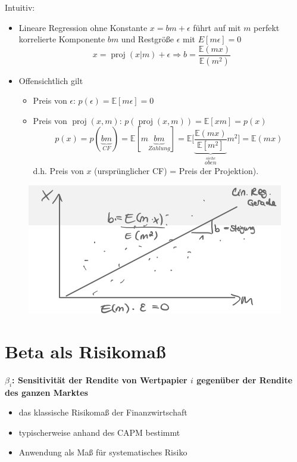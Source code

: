 \documentclass[12pt]{extreport} %
\theoremstyle{named}
\theoremstyle{nnamed}
\theoremstyle{itshape}
\theoremstyle{normal}
\begin{document}
Intuitiv:
\begin{itemize}
	\item Lineare Regression ohne Konstante $x = bm + \epsilon$ führt auf mit $m$ perfekt korrelierte Komponente $bm$ und Restgröße $\epsilon$ mit $E[m\epsilon] = 0$
	$$ x = \operatorname{proj}(x|m) + \epsilon \Rightarrow b = \frac{\mathbb{E}(mx)}{\mathbb{E}(m^2)} $$
	\item Offensichtlich gilt
		\begin{itemize}
			\item Preis von $\epsilon$: $p(\epsilon) = \mathbb{E}[m\epsilon] = 0$
			\item Preis von $\operatorname{proj}(x, m)$: $ p \left(\operatorname{proj}(x, m) \right) = \mathbb{E}[xm] = p(x)$
				$$ p(x) = p(\underbrace{b m}_{CF}) = \mathbb{E}[m\underbrace{bm}_{Zahlung}] = \mathbb{E} \Bigg[ \underbrace{\frac{\mathbb{E}(mx)}{\mathbb{E}[m^2]}}_{\overset{siehe}{oben}} m^2 \Bigg] = \mathbb{E}(mx)$$
				d.h. Preis von $x$ (ursprünglicher CF) = Preis der Projektion).
		\end{itemize}
\end{itemize}

\begin{figure}[h!] \centering
	\includegraphics[scale=0.3]{img/p44}
\end{figure}

\newpage

\section{Beta als Risikomaß}

\textbf{$\beta_i$: Sensitivität der Rendite von Wertpapier $i$ gegenüber der Rendite des ganzen Marktes}
\begin{itemize}
	\item das klassische Risikomaß der Finanzwirtschaft
	\item typischerweise anhand des CAPM  bestimmt
	\item Anwendung als Maß für systematisches Risiko
\end{itemize}
 
\end{document}

